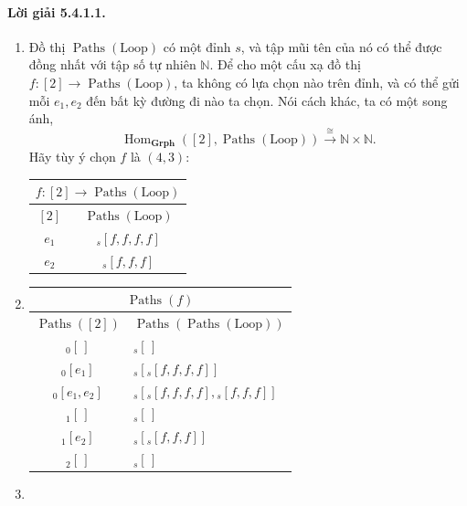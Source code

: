 \paragraph{Lời giải 5.4.1.1.}
\begin{enumerate}[label=\alph*.]
\item Đồ thị $\operatorname{Paths}(\mathrm{Loop})$ có một đỉnh $s$, và tập mũi tên của nó có thể được đồng nhất với tập số tự nhiên $\mathbb N$. Để cho một cấu xạ đồ thị $f:[2]\to\operatorname{Paths}(\mathrm{Loop})$, ta không có lựa chọn nào trên đỉnh, và có thể gửi mỗi $e_1,e_2$ đến bất kỳ đường đi nào ta chọn. Nói cách khác, ta có một song ánh,
\[\operatorname{Hom}_{\mathbf{Grph}}([2],\operatorname{Paths}(\mathrm{Loop}))\xrightarrow{\cong}\mathbb N\times\mathbb N.\]
Hãy tùy ý chọn $f$ là $(4,3)$:
\begin{center}\begin{tabular}{|c|c|}\hline\multicolumn{2}{|c|}{$f:[2]\to\operatorname{Paths}(\mathrm{Loop})$}\\\hline$[2]$&$\operatorname{Paths}(\mathrm{Loop})$\\\hline$e_1$&${}_{s}[f,f,f,f]$\\$e_2$&${}_{s}[f,f,f]$\\\hline\end{tabular}\end{center}
\item
\begin{center}\begin{tabular}{|c|l|}\hline\multicolumn{2}{|c|}{$\operatorname{Paths}(f)$}\\\hline$\operatorname{Paths}([2])$&$\operatorname{Paths}(\operatorname{Paths}(\mathrm{Loop}))$\\\hline${}_{0}[\,]$&${}_{s}[\,]$\\${}_{0}[e_1]$&${}_{s}[{}_{s}[f,f,f,f]]$\\${}_{0}[e_1,e_2]$&${}_{s}[{}_{s}[f,f,f,f],{}_{s}[f,f,f]]$\\${}_{1}[\,]$&${}_{s}[\,]$\\${}_{1}[e_2]$&${}_{s}[{}_{s}[f,f,f]]$\\${}_{2}[\,]$&${}_{s}[\,]$\\\hline\end{tabular}\end{center}
\item{}

\end{enumerate}
